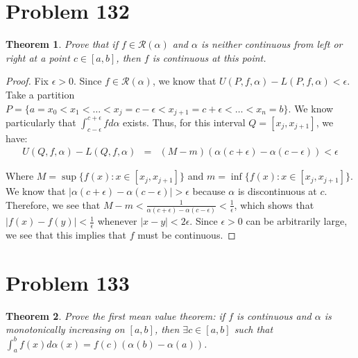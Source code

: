 \documentclass[psamsfonts]{amsart}
\newtheorem{thm}{Theorem}[section]
\theoremstyle{definition}
\theoremstyle{remark}
\numberwithin{equation}{section}
\begin{document}
\section{Problem 132}

\begin{thm}
Prove that if $f \in \mathscr{R}(\alpha)$ and $\alpha$ is neither continuous from left or right at a point $c \in [a,b]$, then $f$ is continuous at this point.
\end{thm}

\begin{proof}
Fix $\epsilon > 0$. Since $f \in \mathscr{R}(\alpha)$, we know that $U(P,f,\alpha) - L(P,f,\alpha) < \epsilon$. Take a partition $P = \{ a = x_0 < x_1 < \ldots < x_j = c - \epsilon < x_{j+1} = c + \epsilon < \ldots < x_n = b \}$. We know particularly that $\int_{c - \epsilon}^{c + \epsilon} f d \alpha$ exists. Thus, for this interval $Q = [x_j, x_{j+1}]$, we have:
\begin{eqnarray}
U(Q,f,\alpha) - L(Q,f,\alpha) &=& (M - m) ( \alpha(c + \epsilon) - \alpha(c - \epsilon)) < \epsilon
\end{eqnarray}

Where $M = \sup \{ f(x) : x \in [x_j, x_{j+1}] \}$ and $m = \inf \{ f(x): x \in [x_j, x_{j+1}] \}$. We know that $|\alpha(c + \epsilon) - \alpha(c - \epsilon) | > \epsilon$ because $\alpha$ is discontinuous at $c$. Therefore, we see that $M - m < \frac{1}{ \alpha(c + \epsilon) - \alpha(c - \epsilon)} < \frac{1}{\epsilon}$, which shows that $|f(x) - f(y)| < \frac{1}{\epsilon}$ whenever $|x - y| < 2 \epsilon$. Since $\epsilon>0$ can be arbitrarily large, we see that this implies that $f$ must be continuous. 
\end{proof}

\section{Problem 133}

\begin{thm}
Prove the first mean value theorem: if $f$ is continuous and $\alpha$ is monotonically increasing on $[a,b]$, then $\exists c \in [a,b]$ such that $\int_a^b f(x) d \alpha(x) = f(c) (\alpha(b) - \alpha(a))$. 
\end{thm}
\end{document}
